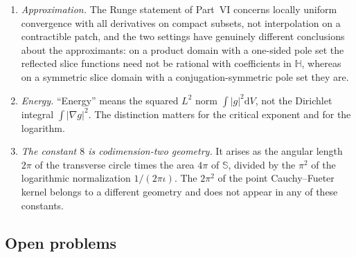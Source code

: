 \documentclass[11pt,a4paper]{article}
\numberwithin{equation}{section}
\theoremstyle{definition}
\theoremstyle{remark}
\theoremstyle{plain}
\newcommand{\HH}{\mathbb H}
\newcommand{\SSS}{\mathbb S}
\newcommand{\lap}{\Delta_4}
\newcommand{\SR}{\mathcal{SR}}
\newcommand{\AM}{\mathcal{AM}}
\newcommand{\abs}[1]{\lvert #1\rvert}
\newcommand{\dd}{\mathrm d}
\begin{document}
\begin{enumerate}[label=\textup{(B\arabic*)}]
bounded in any unspecified weighted, Hardy, Bergman, Sobolev or Hilbert
norm, and the direct sum $\AM=\lap\SR\oplus S(\HH^{2m})$ is not asserted to
be orthogonal in any such norm. No uniform conditioning is claimed when
holes collide or approach the real axis.
\item \emph{Approximation.} The Runge statement of Part~VI concerns locally
uniform convergence with all derivatives on compact subsets, not
interpolation on a contractible patch, and the two settings have genuinely
different conclusions about the approximants: on a product domain with a
one-sided pole set the reflected slice functions need not be rational with
coefficients in $\HH$, whereas on a symmetric slice domain with a
conjugation-symmetric pole set they are.
\item \emph{Energy.} ``Energy'' means the squared $L^2$ norm
$\int\abs g^2\dd V$, not the Dirichlet integral $\int\abs{\nabla g}^2$.
The distinction matters for the critical exponent and for the logarithm.
\item \emph{The constant $8$ is codimension-two geometry.} It arises as the
angular length $2\pi$ of the transverse circle times the area $4\pi$ of
$\SSS$, divided by the $\pi^2$ of the logarithmic normalization
$1/(2\pi\iota)$. The $2\pi^2$ of the point Cauchy--Fueter kernel belongs to
a different geometry and does not appear in any of these constants.
\end{enumerate}

\subsection{Open problems}
\label{f:sub:open}
\end{document}
